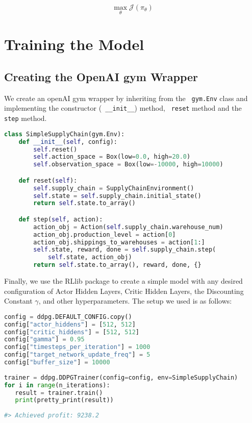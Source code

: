 \documentclass{article}
\begin{document}
\begin{equation} 
    \max_{\theta}\mathcal{J}(\pi_{\theta})
\end{equation}

\pagebreak

\section{Training the Model}
\subsection{Creating the OpenAI gym Wrapper}

We create an openAI gym wrapper by inheriting from the \lstinline{ gym.Env} class and implementing the constructor (\lstinline{ __init__}) method, \lstinline{ reset} method and the \lstinline{ step} method. 

\begin{lstlisting}[language=Python]
class SimpleSupplyChain(gym.Env):
    def __init__(self, config):
        self.reset()
        self.action_space = Box(low=0.0, high=20.0)
        self.observation_space = Box(low=-10000, high=10000)

    def reset(self):
        self.supply_chain = SupplyChainEnvironment()
        self.state = self.supply_chain.initial_state()
        return self.state.to_array()

    def step(self, action):
        action_obj = Action(self.supply_chain.warehouse_num)
        action_obj.production_level = action[0]
        action_obj.shippings_to_warehouses = action[1:]
        self.state, reward, done = self.supply_chain.step(
            self.state, action_obj)
        return self.state.to_array(), reward, done, {}
\end{lstlisting}

Finally, we use the RLlib package to create a simple model with any desired configuration of Actor Hidden Layers, Critic Hidden Layers, the Discounting Constant \( \gamma \), and other hyperparameters. The setup we used is as follows:

\begin{lstlisting}[language=Python]
config = ddpg.DEFAULT_CONFIG.copy()
config["actor_hiddens"] = [512, 512] 
config["critic_hiddens"] = [512, 512]
config["gamma"] = 0.95
config["timesteps_per_iteration"] = 1000
config["target_network_update_freq"] = 5
config["buffer_size"] = 10000
    
trainer = ddpg.DDPGTrainer(config=config, env=SimpleSupplyChain)
for i in range(n_iterations):
   result = trainer.train()
   print(pretty_print(result))
  
#> Achieved profit: 9238.2
\end{lstlisting}
\end{document}
